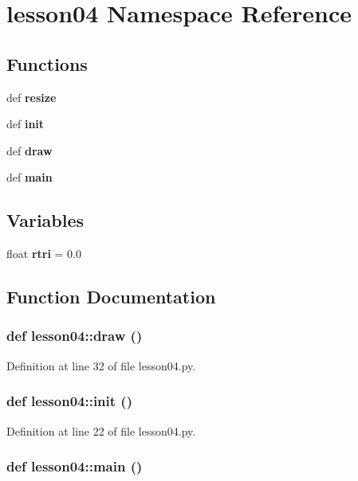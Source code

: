 \section{lesson04 Namespace Reference}
\label{namespacelesson04}


\subsection*{Functions}
\begin{CompactItemize}
\item 
def {\bf resize}
\item 
def {\bf init}
\item 
def {\bf draw}
\item 
def {\bf main}
\end{CompactItemize}
\subsection*{Variables}
\begin{CompactItemize}
\item 
float {\bf rtri} = 0.0
\end{CompactItemize}


\subsection{Function Documentation}
\subsubsection{\setlength{\rightskip}{0pt plus 5cm}def lesson04::draw ()}\label{namespacelesson04_d02115845fe2427a3839f5b80b47727c}




Definition at line 32 of file lesson04.py.
\subsubsection{\setlength{\rightskip}{0pt plus 5cm}def lesson04::init ()}\label{namespacelesson04_c382580edc8008a83bd689be67223a35}




Definition at line 22 of file lesson04.py.
\subsubsection{\setlength{\rightskip}{0pt plus 5cm}def lesson04::main ()}\label{namespacelesson04_e014fb6e9c258426c5848fd5daf8b3f1}




